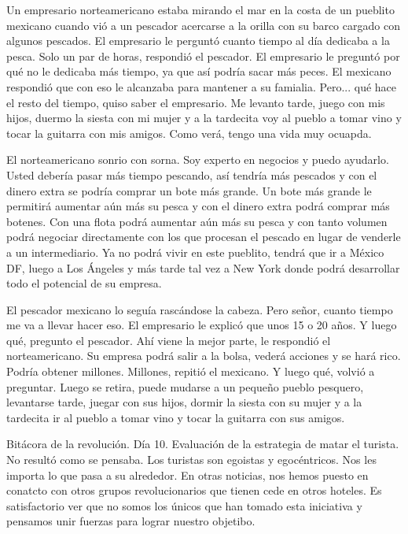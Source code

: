 \documentclass[11pt,twoside,openright,a6paper]{book}
\begin{document}
Un empresario norteamericano estaba mirando el mar en la costa de un
pueblito mexicano cuando vió a un pescador acercarse a la orilla con
su barco cargado con algunos pescados. El empresario le perguntó cuanto
tiempo al día dedicaba a la pesca. Solo un par de horas, respondió el
pescador. El empresario le preguntó por qué no le dedicaba más tiempo,
ya que así podría sacar más peces. El mexicano respondió que con eso
le alcanzaba para mantener a su famialia. Pero... qué hace el resto del
tiempo, quiso saber el empresario. Me levanto tarde, juego con mis hijos,
duermo la siesta con mi mujer y a la tardecita voy al pueblo a tomar vino
y tocar la guitarra con mis amigos. Como verá, tengo una vida muy ocuapda.

El norteamericano sonrio con sorna. Soy experto en negocios y puedo
ayudarlo. Usted debería pasar más tiempo pescando, así tendría más
pescados y con el dinero extra se podría comprar un bote más grande. Un
bote más grande le permitirá aumentar aún más su pesca y con el dinero
extra podrá comprar más botenes. Con una flota podrá aumentar aún más su
pesca y con tanto volumen podrá negociar directamente con los que procesan
el pescado en lugar de venderle a un intermediario. Ya no podrá vivir en
este pueblito, tendrá que ir a México DF, luego a Los Ángeles y más tarde
tal vez a New York donde podrá desarrollar todo el potencial de su empresa.

El pescador mexicano lo seguía rascándose la cabeza. Pero señor, cuanto
tiempo me va a llevar hacer eso. El empresario le explicó que unos 15 o
20 años. Y luego qué, pregunto el pescador. Ahí viene la mejor parte,
le respondió el norteamericano. Su empresa podrá salir a la bolsa,
vederá acciones y se hará rico. Podría obtener millones. Millones,
repitió el mexicano. Y luego qué, volvió a preguntar. Luego se retira,
puede mudarse a un pequeño pueblo pesquero, levantarse tarde, juegar con
sus hijos, dormir la siesta con su mujer y a la tardecita ir al pueblo a
tomar vino y tocar la guitarra con sus amigos.


\vspace{0.5cm}
\hrulefill\hspace{0.2cm} \decofourleft\decofourright \hspace{0.2cm} \hrulefill
\vspace{0.5cm}

Bitácora de la revolución. Día 10. Evaluación de la estrategia de
matar el turista. No resultó como se pensaba. Los turistas son egoistas y
egocéntricos. Nos les importa lo que pasa a su alrededor. En otras noticias,
nos hemos puesto en conatcto con otros grupos revolucionarios que tienen
cede en otros hoteles. Es satisfactorio ver que no somos los únicos que han
tomado esta iniciativa y pensamos unir fuerzas para lograr nuestro objetibo.
\end{document}
